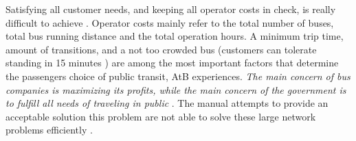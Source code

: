  Satisfying all customer needs, and keeping all operator costs in check, is really difficult to achieve \citep{kechagiopoulos14}. Operator costs mainly refer to the total number of buses, total bus running distance and the total operation hours. A minimum trip time, amount of transitions, and a not too crowded bus (customers can tolerate standing in 15 minutes ) are among the most important factors that determine the passengers choice of public transit, AtB experiences.  
 \textit{The main concern of bus companies is maximizing its profits, while the main concern of the government is to fulfill all needs of traveling in public} \citep{kechagiopoulos14}. The manual attempts to provide an acceptable solution this problem are not able to solve these large network problems efficiently \citep{kechagiopoulos14}. 




















